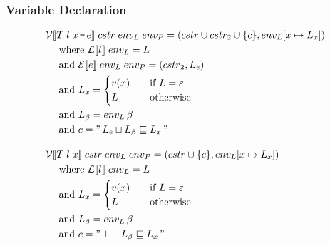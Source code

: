 \subsubsection{Variable Declaration}
\begin{align*}
& \iV\dblSq{T \; l \; x \tk = e} \; \icstr \; \ienvL \; \ienvP = (\icstr \cup \icstr_2 \cup \{ c \}, \ienvL[x \mapsto L_x]) \\
& \dsWhere{\iL\dblSq{l} \; \ienvL = L} \\
& \dsAnd{\iE\dblSq{e} \; \ienvL \; \ienvP = (\icstr_2, L_e)} \\
& \dsAnd{L_x = \begin{cases}
    v(x) & \quad \text{if } L = \varepsilon \\
    L & \quad \text{otherwise}
  \end{cases}} \\
& \dsAnd{L_\ib = \ienvL \, \ib} \\
& \dsAnd{c = " \, L_e \sqcup L_\ib \sqsubseteq L_x \, "} \rspace
& \iV\dblSq{T \; l \; x} \; \icstr \; \ienvL \; \ienvP = (cstr \cup \{ c \}, \ienvL[x \mapsto L_x])\\
& \dsWhere{\iL\dblSq{l} \; \ienvL = L} \\
& \dsAnd{L_x = \begin{cases}
    v(x) & \quad \text{if } L = \varepsilon \\
    L & \quad \text{otherwise}
  \end{cases}} \\
& \dsAnd{L_\ib = \ienvL \, \ib} \\
& \dsAnd{c = " \, \bot \sqcup L_\ib \sqsubseteq L_x \, "}
\end{align*}

